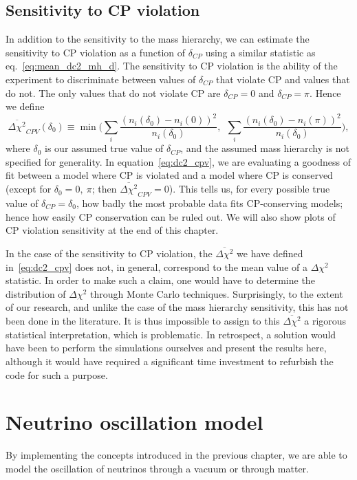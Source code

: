 \subsection{Sensitivity to CP violation}\label{sec:sens_cpv}
In addition to the sensitivity to the mass hierarchy, we can estimate the
sensitivity to CP violation as a function of $\delta_{CP}$ using a similar
statistic as eq.~\ref{eq:mean_dc2_mh_d}. The sensitivity to CP violation
is the ability of the experiment to discriminate between values of
$\delta_{CP}$ that violate CP and values that do not. The only values that
do not violate CP are $\delta_{CP}=0$ and $\delta_{CP}=\pi$. Hence we define
\begin{equation}
	\overline{\Delta\chi^2}_{CPV}(\delta_0) \equiv \min\bigg(\sum_i
	\frac{(n_i(\delta_0) - n_i(0))^2}{n_i(\delta_0)},~~\sum_i
	\frac{(n_i(\delta_0) - n_i(\pi))^2}{n_i(\delta_0)}\bigg),\label{eq:dc2_cpv}
\end{equation}
where $\delta_0$ is our assumed true value of $\delta_{CP}$, and the assumed mass
hierarchy is not specified for generality. In equation~\ref{eq:dc2_cpv}, we are
evaluating a goodness of fit between a model where CP is violated and a model
where CP is conserved (except for $\delta_0=0,~\pi$; then
$\overline{\Delta\chi^2}_{CPV}=0$). 
This tells us, for every possible true value of $\delta_{CP}=\delta_0$, how
badly the most probable data fits CP-conserving models; hence how easily CP
conservation can be ruled out. We will also show plots of CP violation sensitivity
at the end of this chapter. 

In the case of the sensitivity to CP violation, the $\overline{\Delta\chi^2}$
we have defined in~\ref{eq:dc2_cpv} does not, in general, correspond to the mean
value of a $\Delta\chi^2$ statistic. In order to make such a claim, one would
have to determine the distribution of $\Delta\chi^2$ through Monte Carlo
techniques. Surprisingly, to the extent of our research, and unlike the case of
the mass hierarchy sensitivity, this has not been done in the literature.  It
is thus impossible to assign to this $\overline{\Delta\chi^2}$ a rigorous
statistical interpretation, which is problematic. In retrospect, a solution
would have been to perform the simulations ourselves and present the results
here, although it would have required a significant time investment to
refurbish the code for such a purpose.


\section{Neutrino oscillation model}
By implementing the concepts introduced in the previous chapter, we are able to
model the oscillation of neutrinos through a vacuum or through matter.

